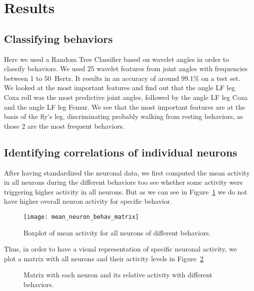\section{Results}


\subsection{Classifying behaviors}

Here we used a Random Tree Classifier based on wavelet angles in order to classify behaviors. We used 25 wavelet features from joint angles with frequencies between 1 to \SI{50}{Hertz}. It results in an accuracy of around 99.1\% on a test set. We looked at the most important features and find out that the angle LF leg Coxa roll was the most predictive joint angles, followed by the angle LF leg Coxa and the angle LF leg Femur. We see that the most important features are at the basis of the fly's leg, discriminating probably walking from resting behaviors, as those 2 are the most frequent behaviors. 

\subsection{Identifying correlations of individual neurons}

After having standardized the neuronal data, we first computed the mean activity in all neurons during the different behaviors too see whether some activity were triggering higher activity in all neurons. But as we can see in Figure~\ref{fig:mean_neuron_behav_matrix} we do not have higher overall neuron activity for specific behavior. 

\begin{figure}[htbp]
	\begin{center}
		\texttt{[image: mean\_neuron\_behav\_matrix]}
	\end{center}
	\caption{Boxplot of mean activity for all neurons of different behaviors.}
	\label{fig:mean_neuron_behav_matrix}
\end{figure}

Thus, in order to have a visual representation of specific neuronal activity, we plot a matrix with all neurons and their activity levels in Figure~\ref{fig:neuron_behav_matrix} 

\begin{figure}[htbp]
	\begin{center}
		
	\end{center}
	\caption{Matrix with each neuron and its relative activity with different behaviors.}
	\label{fig:neuron_behav_matrix}
\end{figure}

